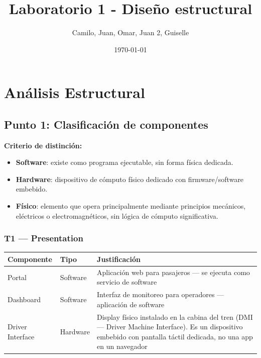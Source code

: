 \documentclass[a4paper, 10 pt]{article}
\title{\textbf{Laboratorio 1 - Diseño estructural}}
\author{Camilo, Juan, Omar, Juan 2, Guiselle}
\date{\today}
\begin{document}
\maketitle

\section{Análisis Estructural}

\subsection{Punto 1: Clasificación de componentes}

\textbf{Criterio de distinción:}
\begin{itemize}
    \item \textbf{Software}: existe como programa ejecutable, sin forma física dedicada.
    \item \textbf{Hardware}: dispositivo de cómputo físico dedicado con firmware/software embebido.
    \item \textbf{Físico}: elemento que opera principalmente mediante principios mecánicos, eléctricos o electromagnéticos, sin lógica de cómputo significativa.
\end{itemize}

\subsubsection{T1 --- Presentation}

\begin{table}[H]
\centering
\footnotesize
\begin{tabular}{|R{0.15\textwidth}|M{0.1\textwidth}|R{0.55\textwidth}|}
\hline
\textbf{Componente} & \textbf{Tipo} & \textbf{Justificación} \\
\hline
Portal & Software & Aplicación web para pasajeros --- se ejecuta como servicio de software \\
\hline
Dashboard & Software & Interfaz de monitoreo para operadores --- aplicación de software \\
\hline
Driver Interface & Hardware & Display físico instalado en la cabina del tren (DMI --- Driver Machine Interface). Es un dispositivo embebido con pantalla táctil dedicada, no una app en un navegador \\
\hline
\end{tabular}
\end{table}
\end{document}
